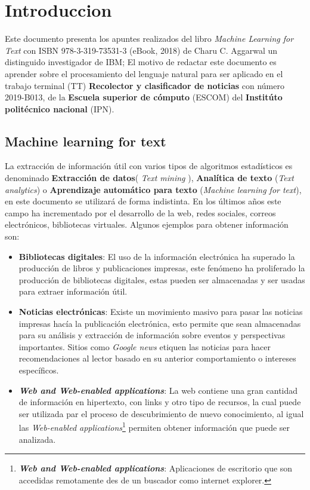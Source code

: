 \chapter{Introduccion}

Este documento presenta los apuntes realizados del libro \textit{Machine Learning for Text} con  ISBN 978-3-319-73531-3 (eBook, 2018) de Charu C. Aggarwal un distinguido investigador de IBM; El motivo de redactar este documento es aprender sobre el procesamiento del lenguaje natural para ser aplicado en el trabajo terminal (TT) \textbf{Recolector y clasificador de noticias} con número 2019-B013, de la \textbf{Escuela superior de cómputo} (ESCOM) del \textbf{Institúto politécnico nacional} (IPN).\\

\section{Machine learning for text}

La extracción de información útil con varios tipos de algoritmos estadísticos es denominado \textbf{Extracción de datos}( \textit{Text mining} ), \textbf{Analítica de texto} (\textit{Text analytics}) o \textbf{Aprendizaje automático para texto} (\textit{Machine learning for text}), en este documento se utilizará de forma indistinta. En los últimos años este campo ha incrementado por el desarrollo de la web, redes sociales, correos electrónicos, bibliotecas virtuales. Algunos ejemplos para obtener información son:

\begin{itemize}

	\item \textbf{Bibliotecas digitales}: El uso de la información electrónica ha superado la producción de libros y publicaciones impresas, este fenómeno ha proliferado la producción de bibliotecas digitales, estas pueden ser almacenadas y ser usadas para extraer información útil.

	\item \textbf{Noticias electrónicas}: Existe un movimiento masivo para pasar las noticias impresas hacía la publicación electrónica, esto permite que sean almacenadas para su análisis y extracción de información sobre eventos y perspectivas importantes. Sitios como \textit{Google news} etiquen las noticias para hacer recomendaciones al lector basado en su anterior comportamiento o intereses específicos.

	\item \textbf{\textit{Web and Web-enabled applications}}: La web contiene una gran cantidad de información en hipertexto, con links y otro tipo de recursos, la cual puede ser utilizada par el proceso de descubrimiento de nuevo conocimiento, al igual las \textit{Web-enabled applications}\footnote{\textbf{\textit{Web and Web-enabled applications}}: Aplicaciones de escritorio que son  accedidas remotamente des de un buscador como internet explorer.} permiten obtener información que puede ser analizada.


\end{itemize}






